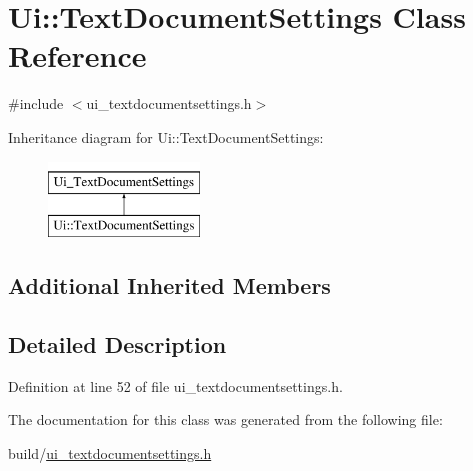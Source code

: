 \hypertarget{classUi_1_1TextDocumentSettings}{\section{Ui\+:\+:Text\+Document\+Settings Class Reference}
\label{classUi_1_1TextDocumentSettings}
}


{\ttfamily \#include $<$ui\+\_\+textdocumentsettings.\+h$>$}

Inheritance diagram for Ui\+:\+:Text\+Document\+Settings\+:\begin{figure}[H]
\begin{center}
\leavevmode
\includegraphics[height=2.000000cm]{classUi_1_1TextDocumentSettings}
\end{center}
\end{figure}
\subsection*{Additional Inherited Members}


\subsection{Detailed Description}


Definition at line 52 of file ui\+\_\+textdocumentsettings.\+h.



The documentation for this class was generated from the following file\+:\begin{DoxyCompactItemize}
\item 
build/\hyperlink{ui__textdocumentsettings_8h}{ui\+\_\+textdocumentsettings.\+h}\end{DoxyCompactItemize}
